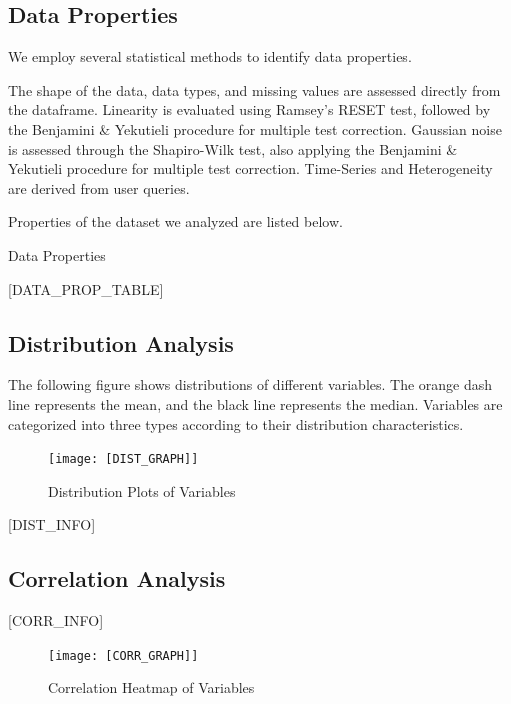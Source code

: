 \documentclass{article}
\begin{document}
\subsection{Data Properties}
We employ several statistical methods to identify data properties.

The shape of the data, data types, and missing values are assessed directly from the dataframe.
Linearity is evaluated using Ramsey’s RESET test, followed by the Benjamini \& Yekutieli procedure for multiple test correction.
Gaussian noise is assessed through the Shapiro-Wilk test, also applying the Benjamini \& Yekutieli procedure for multiple test correction.
Time-Series and Heterogeneity are derived from user queries.

Properties of the dataset we analyzed are listed below.

\begin{table}[H]
    \centering
    \caption{Data Properties}
[DATA_PROP_TABLE]
\end{table}


\subsection{Distribution Analysis}
The following figure shows distributions of different variables. The orange dash line represents the mean, 
and the black line represents the median. Variables are categorized into three types according to their distribution characteristics.

\begin{figure}[H]
\centering
\texttt{[image: [DIST\_GRAPH]]}
\caption{\label{fig:dist}Distribution Plots of Variables}
\end{figure}

[DIST_INFO]

\subsection{Correlation Analysis}

\begin{minipage}[t]{0.5\linewidth}
    [CORR_INFO]
\vfill
\end{minipage}
\hfill
\begin{minipage}[t]{0.5\linewidth}
    \begin{figure}[H]
        \centering
        \vspace{-1.5cm}
        \texttt{[image: [CORR\_GRAPH]]}
        \caption{\label{fig:corr}Correlation Heatmap of Variables}
    \end{figure}
\end{minipage}
\end{document}
